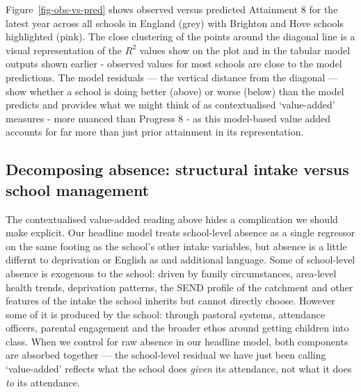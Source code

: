 \documentclass[
  12pt,
  titlepage]{article}
\begin{document}
Figure~\ref{fig-obs-vs-pred} shows observed versus predicted Attainment
8 for the latest year across all schools in England (grey) with Brighton
and Hove schools highlighted (pink). The close clustering of the points
around the diagonal line is a visual representation of the \(R^2\)
values show on the plot and in the tabular model outputs shown earlier -
observed values for most schools are close to the model predictions. The
model residuals --- the vertical distance from the diagonal --- show
whether a school is doing better (above) or worse (below) than the model
predicts and provides what we might think of as contextualised
`value-added' measures - more nuanced than Progress 8 - as this
model-based value added accounts for far more than just prior attainment
in its representation.

\subsection{Decomposing absence: structural intake versus school
management}\label{decomposing-absence-structural-intake-versus-school-management}

The contextualised value-added reading above hides a complication we
should make explicit. Our headline model treats school-level absence as
a single regressor on the same footing as the school's other intake
variables, but absence is a little differnt to deprivation or English as
and additional language. Some of school-level absence is exogenous to
the school: driven by family circumstances, area-level health trends,
deprivation patterns, the SEND profile of the catchment and other
features of the intake the school inherits but cannot directly choose.
However some of it is produced by the school: through pastoral systems,
attendance officers, parental engagement and the broader ethos around
getting children into class. When we control for raw absence in our
headline model, both components are absorbed together --- the
school-level residual we have just been calling `value-added' reflects
what the school does \emph{given} its attendance, not what it does
\emph{to} its attendance.
\end{document}
